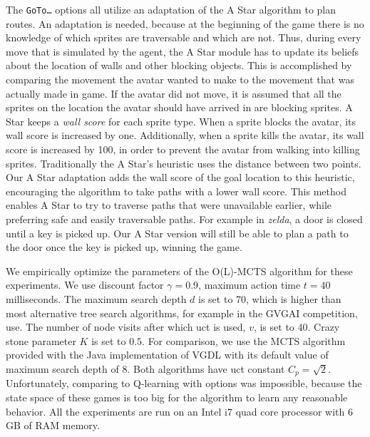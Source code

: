The \texttt{GoTo\ldots} options all utilize an adaptation of the A Star
algorithm to plan routes. An adaptation is needed, because at the beginning of
the game there is no knowledge of which sprites are traversable and which are
not. Thus, during every move that is simulated by the agent, the A Star module
has to update its beliefs about the location of walls and other blocking
objects. This is accomplished by comparing the movement the avatar wanted to
make to the movement that was actually made in game. If the avatar did not move,
it is assumed that all the sprites on the location the avatar should have
arrived in are blocking sprites. A Star keeps a \emph{wall score} for each
sprite type. When a sprite blocks the avatar, its wall score is increased by
one. Additionally, when a sprite kills the avatar, its wall score is increased
by 100, in order to prevent the avatar from walking into killing sprites.
Traditionally the A Star's heuristic uses the distance between two points. Our A
Star adaptation adds the wall score of the goal location to this heuristic,
encouraging the algorithm to take paths with a lower wall score. This method
enables A Star to try to traverse paths that were unavailable earlier, while
preferring safe and easily traversable paths. For example in \textit{zelda}, a
door is closed until a key is picked up. Our A Star version will still be able
to plan a path to the door once the key is picked up, winning the game.

We empirically optimize the parameters of the O(L)-MCTS algorithm
for these experiments. We use discount factor $\gamma = 0.9$, maximum action
time $t = 40$ milliseconds. The maximum search depth $d$ is set to 70, which is
higher than most alternative tree search algorithms, for example in the GVGAI
competition, use. The number of node visits after which \textsf{uct} is used,
$v$, is set to 40. Crazy stone parameter $K$ is set to $0.5$.  For comparison,
we use the MCTS algorithm provided with the Java implementation of VGDL with its
default value of maximum search depth of 8. Both algorithms have \textsf{uct}
constant $C_p = \sqrt{2}$. Unfortunately, comparing to Q-learning with options
was impossible, because the state space of these games is too big for the
algorithm to learn any reasonable behavior. All the experiments are run on an
Intel i7  quad core processor with 6 GB of RAM memory.

